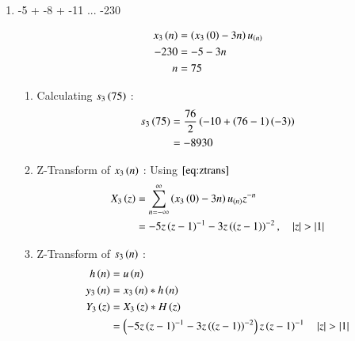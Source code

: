 \documentclass[journal,12pt,onecolumn]{IEEEtran}
\theoremstyle{remark}
\begin{document}
\begin{enumerate}[\brak{i}]
\vspace{0.5cm} 
\item[\brak{iii}]
-5 + -8 + -11 ... -230
\vspace{0.5cm}

\begin{align}
x_3\left(n\right) &= \left(x_3\left(0\right) -3n\right)u_{\left(n\right)}\\
-230 &= -5 -3n \\
n &= 75
\end{align}
\begin{enumerate}[1.]
\item
Calculating $s_3\left(75\right)$ :
\begin{align}
    s_3\left(75\right) &= \frac{76}{2}\left(-10+\left(76-1\right)\left(-3\right)\right)\\
    &= -8930
    \end{align}

\item
Z-Transform of $x_3\left(n\right)$ :
Using $\eqref{eq:ztrans}$
\begin{align}
X_3\left(z\right) &= \sum_{n=-\infty}^{\infty}\left(x_3\left(0\right) -3n\right)u_{\left(n\right)}z^{-n} \\
 &=  -5z\left(z-1\right)^{-1}-
       3z\left(\left(z-1\right)\right)^{-2} \label{eq:ee25-8}
,\quad \left\vert z\right\vert>\left\vert1\right\vert 
\end{align}

    \vspace{0.5cm}
\item
Z-Transform of $s_3\left(n\right)$ :
\begin{align}
         h\left(n\right) &= u\left(n\right) \\
    y_3\left(n\right) &= x_3\left(n\right) * h\left(n\right) \\
    Y_3\left(z\right) &= X_3\left(z\right) * H\left(z\right)\\
             &= \left(-5z\left(z-1\right)^{-1}-
       3z\left(\left(z-1\right)\right)^{-2}\right)z\left(z-1\right)^{-1}
\quad \left\vert z\right\vert>\left\vert1\right\vert 
    \end{align}


\end{enumerate}
\end{enumerate}
\end{document}
